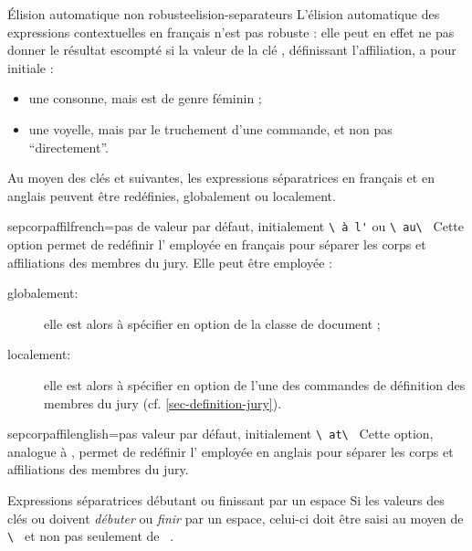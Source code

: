 \begin{dbwarning}{Élision automatique non robuste}{elision-separateurs}
  L'élision automatique des expressions contextuelles en français n'est pas
  robuste : elle peut en effet ne pas donner le résultat escompté si la valeur
  de la clé , définissant l'affiliation, a pour initiale :
  \begin{itemize}
  \item une consonne, mais est de genre féminin ;
  \item une voyelle, mais par le truchement d'une commande\commandeacronyme, et
    non pas \enquote{directement}.
  \end{itemize}
\end{dbwarning}

Au moyen des clés  et 
suivantes, les expressions séparatrices en français et en anglais peuvent être
redéfinies, globalement ou localement.

\begin{docKey}{sepcorpaffilfrench}{=}{pas de valeur par défaut,
    initialement \lstinline[showspaces]+\ à l'+ ou
    \lstinline[showspaces]+\ au\ +}
  Cette option permet de redéfinir l' employée en français
  pour séparer les corps et affiliations des membres du jury. Elle peut
  être employée :
  \begin{description}
  \item[globalement:] elle est alors à spécifier en option de la classe de
    document ;
  \item[localement:] elle est alors à spécifier en option de l'une des
    commandes de définition des membres du jury (cf.
    \vref{sec-definition-jury}).
  \end{description}
\end{docKey}

\begin{docKey}{sepcorpaffilenglish}{=}{pas valeur par
    défaut, initialement \lstinline[showspaces]+\ at\ +}
  Cette option, analogue à , permet de redéfinir
  l' employée en anglais pour séparer les corps et
  affiliations des membres du jury.
\end{docKey}

\begin{dbwarning}{Expressions séparatrices débutant ou finissant par un espace}{}
  Si les valeurs des clés  ou
   doivent \emph{débuter} ou \emph{finir} par un
  espace, celui-ci doit être saisi au moyen de
  \lstinline[showspaces]+\ +
  et non pas seulement de
  \lstinline[showspaces]+ +.
\end{dbwarning}

